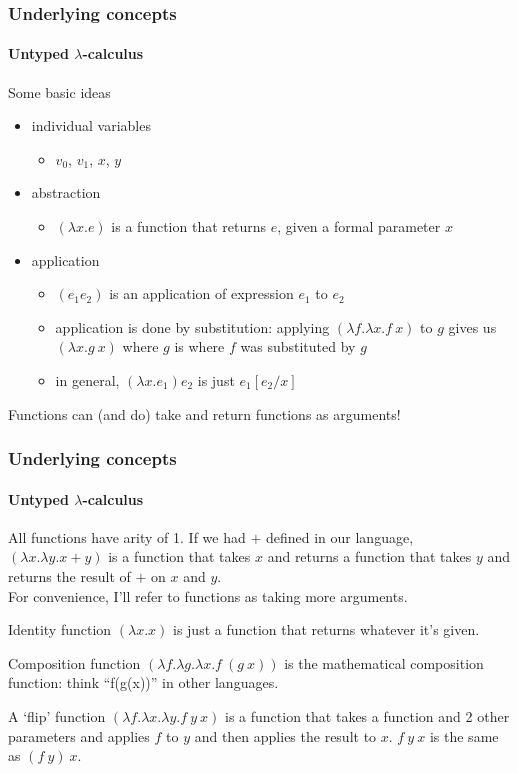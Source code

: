 \documentclass{beamer}
\begin{document}
\begin{frame}
  \frametitle{Underlying concepts}
  \framesubtitle{Untyped $\lambda$-calculus }
  Some basic ideas
  \pause
  \begin{itemize}[<+->]
    \item individual variables
      \begin{itemize}
        \item $v_0$, $v_1$, $x$, $y$
      \end{itemize}
    \item abstraction
      \begin{itemize}
        \item $(\lambda x.e)$ is a function that returns $e$, given a
          formal parameter $x$
      \end{itemize}
    \item application
      \begin{itemize}
        \item $(e_1e_2)$ is an application of expression $e_1$ to
          $e_2$
        \item application is done by substitution: applying $(\lambda f.\lambda
          x.f\:x)$ to $g$ gives us $(\lambda x.g\:x)$ where $g$ is
          where $f$ was substituted by $g$
        \item in general, $(\lambda x.e_1)e_2$ is just $e_1[e_2/x]$
      \end{itemize}
  \end{itemize}
  \pause
  Functions can (and do) take and return functions as arguments!
\end{frame}
\begin{frame}
  \frametitle{Underlying concepts}
  \framesubtitle{Untyped $\lambda$-calculus}
  All functions have arity of 1. If we had $+$ defined in our language,
  $(\lambda x.\lambda y. x + y)$ is a function that takes $x$ and
  returns a function that takes $y$ and returns the result of $+$ on
  $x$ and $y$.\\
  \pause
  For convenience, I'll refer to functions as taking more arguments.
  \pause
  \begin{exampleblock}{Identity function}
    $(\lambda x.x)$ is just a function that returns whatever it's
    given.
  \end{exampleblock}
  \pause
  \begin{exampleblock}{Composition function}
    $(\lambda f.\lambda g.\lambda x.f\:(g\:x))$ is the mathematical
    composition function: think ``f(g(x))'' in other languages.
  \end{exampleblock}
  \pause
  \begin{exampleblock}{A `flip' function}
    $(\lambda f.\lambda x.\lambda y.f\:y\:x)$ is a function
    that takes a function and 2 other parameters and applies $f$ to
    $y$ and then applies the result to $x$. $f\:y\:x$ is the same as $(f\:y)\:x$.
  \end{exampleblock}
\end{frame}
\end{document}
